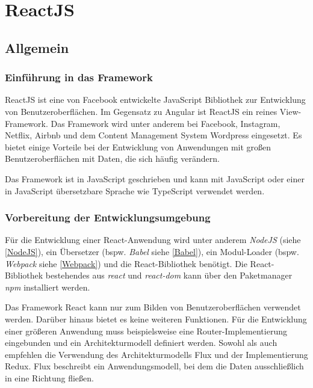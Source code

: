 \chapter{ReactJS}
\label{ch:reactJS}

\section{Allgemein}

\subsection{Einführung in das Framework}\label{sec:rEinf}

ReactJS ist eine von Facebook entwickelte JavaScript Bibliothek zur Entwicklung von Benutzeroberflächen. Im Gegensatz zu Angular ist ReactJS ein reines View-Framework. Das Framework wird unter anderem bei Facebook, Instagram, Netflix, Airbnb und dem Content Management System Wordpress eingesetzt. Es bietet einige Vorteile bei der Entwicklung von Anwendungen mit großen Benutzeroberflächen mit Daten, die sich häufig verändern. 

Das Framework ist in JavaScript geschrieben und kann mit JavaScript oder einer in JavaScript übersetzbare Sprache wie TypeScript verwendet werden.\autocites[vgl.][1\psqq]{Gackenheimer.2015}[vgl.][3\psqq]{Zeigermann.2016}

\subsection{Vorbereitung der Entwicklungsumgebung}\label{sec:rEntw}
Für die Entwicklung einer React-Anwendung wird unter anderem \textit{NodeJS} (siehe \autoref{NodeJS}), ein Übersetzer (bspw. \textit{Babel} siehe \autoref{Babel}), ein Modul-Loader (bspw. \textit{Webpack} siehe \autoref{Webpack}) und die React-Bibliothek benötigt. Die React-Bibliothek bestehendes aus \textit{react} und \textit{react-dom} kann über den Paketmanager \textit{npm} installiert werden. \autocites[vgl.][92\psqq]{Stefanov.2017}[vgl.][8\psqq]{Zeigermann.2016}

Das Framework React kann nur zum Bilden von Benutzeroberflächen verwendet werden. Darüber hinaus bietet es keine weiteren Funktionen. Für die Entwicklung einer größeren Anwendung muss beispielsweise eine Router-Implementierung eingebunden und ein Architekturmodell definiert werden.
Sowohl \textcite{Zeigermann.2016} als auch \textcite{Stefanov.2017} empfehlen die Verwendung des Architekturmodells Flux und der Implementierung Redux. Flux beschreibt ein Anwendungsmodell, bei dem die Daten ausschließlich in eine Richtung fließen. \autocites[vgl.][8]{Zeigermann.2016}[vgl.][11]{Zeigermann.2016}[vgl.][167]{Stefanov.2017} 

